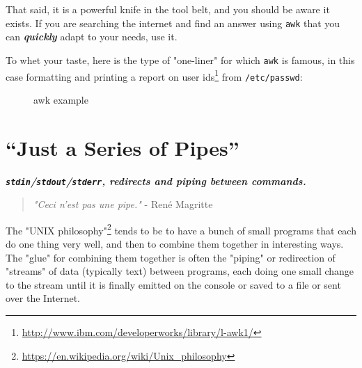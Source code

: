 \documentclass[10pt,american,]{book}
\newenvironment{Shaded}{\begin{snugshade}}{\end{snugshade}}
\newcommand{\KeywordTok}[1]{\textcolor[rgb]{0.13,0.29,0.53}{\textbf{{#1}}}}
\newcommand{\StringTok}[1]{\textcolor[rgb]{0.31,0.60,0.02}{{#1}}}
\newcommand{\NormalTok}[1]{{#1}}
\renewcommand{\href}[2]{#2\footnote{\url{#1}}}
\numberwithin{figure}{chapter}
\DeclareRobustCommand{\drcap}[1]{\begin{figure}[H]\caption{#1}\end{figure}}
\renewcommand{\KeywordTok}[1]{{#1}}
\renewcommand{\StringTok}[1]{{#1}}
\renewcommand{\NormalTok}[1]{{#1}}
\begin{document}
That said, it is a powerful knife in the tool belt, and you should be
aware it exists. If you are searching the internet and find an answer
using \texttt{awk} that you can \textbf{\emph{quickly}} adapt to your
needs, use it.

To whet your taste, here is the type of "one-liner" for which
\texttt{awk} is famous, in this case
\href{http://www.ibm.com/developerworks/library/l-awk1/}{formatting and
printing a report on user ids} from \texttt{/etc/passwd}:

\drcap{awk example}

\begin{Shaded}
\end{Shaded}

\hypertarget{just-a-series-of-pipes}{\chapter{“Just a Series of
Pipes”}\label{just-a-series-of-pipes}}

\textbf{\emph{\texttt{stdin}/\texttt{stdout}/\texttt{stderr}, redirects
and piping between commands.}}

\begin{quote}
\emph{"Ceci n'est pas une pipe."} - René Magritte
\end{quote}

The \href{https://en.wikipedia.org/wiki/Unix_philosophy}{"UNIX
philosophy"} tends to be to have a bunch of small programs that each do
one thing very well, and then to combine them together in interesting
ways. The "glue" for combining them together is often the "piping" or
redirection of "streams" of data (typically text) between programs, each
doing one small change to the stream until it is finally emitted on the
console or saved to a file or sent over the Internet.
\end{document}
